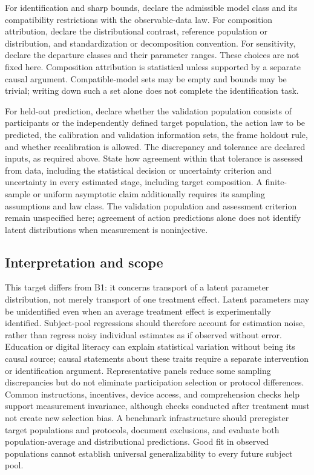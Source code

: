 \documentclass[11pt,a4paper]{article}
\begin{document}
For identification and sharp bounds, declare the admissible model class and its compatibility restrictions with the observable-data law. For composition attribution, declare the distributional contrast, reference population or distribution, and standardization or decomposition convention. For sensitivity, declare the departure classes and their parameter ranges. These choices are not fixed here. Composition attribution is statistical unless supported by a separate causal argument. Compatible-model sets may be empty and bounds may be trivial; writing down such a set alone does not complete the identification task.

For held-out prediction, declare whether the validation population consists of participants or the independently defined target population, the action law to be predicted, the calibration and validation information sets, the frame holdout rule, and whether recalibration is allowed. The discrepancy and tolerance are declared inputs, as required above. State how agreement within that tolerance is assessed from data, including the statistical decision or uncertainty criterion and uncertainty in every estimated stage, including target composition. A finite-sample or uniform asymptotic claim additionally requires its sampling assumptions and law class. The validation population and assessment criterion remain unspecified here; agreement of action predictions alone does not identify latent distributions when measurement is noninjective.

\subsection*{Interpretation and scope}

This target differs from B1: it concerns transport of a latent parameter distribution, not merely transport of one treatment effect. Latent parameters may be unidentified even when an average treatment effect is experimentally identified. Subject-pool regressions should therefore account for estimation noise, rather than regress noisy individual estimates as if observed without error. Education or digital literacy can explain statistical variation without being its causal source; causal statements about these traits require a separate intervention or identification argument. Representative panels reduce some sampling discrepancies but do not eliminate participation selection or protocol differences. Common instructions, incentives, device access, and comprehension checks help support measurement invariance, although checks conducted after treatment must not create new selection bias. A benchmark infrastructure should preregister target populations and protocols, document exclusions, and evaluate both population-average and distributional predictions. Good fit in observed populations cannot establish universal generalizability to every future subject pool.
\end{document}
